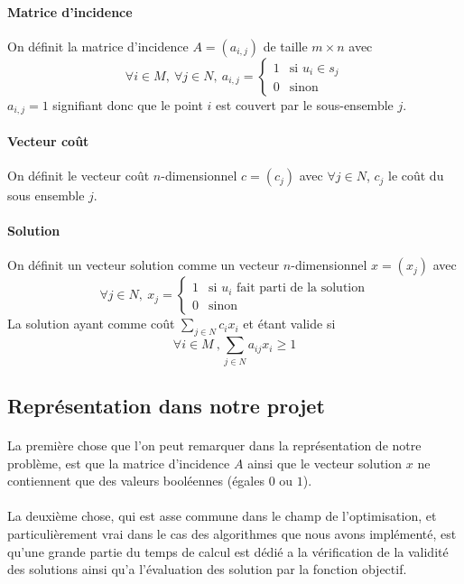 \documentclass[12pt,letterpaper,twoside]{article}
\begin{document}
			\paragraph*{Matrice d'incidence\\}
				On définit la matrice d'incidence \(A = \left(a_{i,j}\right)\) de taille \(m \times n\) avec
				\[\forall i \in M,\ \forall j \in N,\ a_{i,j} = \left\{
				    \begin{array}{ll}
				        1 & \text{si } u_i \in s_j \\
				        0 & \text{sinon}
				    \end{array}
				\right.\]
				\(a_{i,j} = 1\) signifiant donc que le point \(i\) est couvert par le sous-ensemble \(j\).
			\paragraph*{Vecteur coût\\}
				On définit le vecteur coût \(n\)-dimensionnel \(c = \left(c_j\right)\) avec \(\forall j \in N\), \(c_j\) le coût du sous ensemble \(j\).
			\paragraph*{Solution\\}
				On définit un vecteur solution comme un vecteur \(n\)-dimensionnel \(x = \left(x_j\right)\) avec
				\[\forall j \in N,\ x_j = \left\{
				    \begin{array}{ll}
				        1 & \text{si } u_i \text{ fait parti de la solution}\\
				        0 & \text{sinon}
				    \end{array}
				\right.\]
				La solution ayant comme coût \(\sum_{j \in N}{c_i x_i}\) et étant valide si
				\[\forall i \in M\ ,\sum_{j \in N}{a_{ij}x_i} \ge 1\]
		\subsection{Représentation dans notre projet}
			\paragraph*{}
				La première chose que l'on peut remarquer dans la représentation de notre problème, est que la matrice d'incidence \(A\) ainsi que le vecteur solution \(x\) ne contiennent que des valeurs booléennes (égales \(0\) ou \(1\)).
			\paragraph*{}
				La deuxième chose, qui est asse commune dans le champ de l'optimisation, et particulièrement vrai dans le cas des algorithmes que nous avons implémenté, est qu'une grande partie du temps de calcul est dédié a la vérification de la validité des solutions ainsi qu'a l'évaluation des solution par la fonction objectif.
\end{document}

